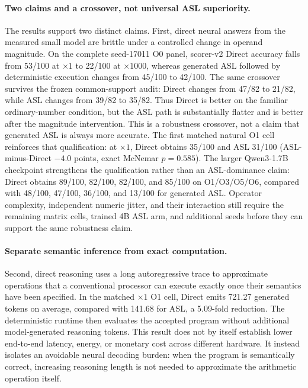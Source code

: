 \documentclass[11pt]{article}
\begin{document}
\paragraph{Two claims and a crossover, not universal ASL superiority.}
The results support two distinct claims.  First, direct neural answers from the
measured small model are brittle under a controlled change in operand magnitude.
On the complete seed-17011 O0 panel, scorer-v2 Direct accuracy falls from
53/100 at $\times1$ to 22/100 at $\times1000$, whereas generated ASL followed
by deterministic execution changes from 45/100 to 42/100.  The same crossover
survives the frozen common-support audit: Direct changes from 47/82 to 21/82,
while ASL changes from 39/82 to 35/82.  Thus Direct is better on the familiar
ordinary-number condition, but the ASL path is substantially flatter and is
better after the magnitude intervention.  This is a robustness crossover, not
a claim that generated ASL is always more accurate.  The first matched natural
O1 cell reinforces that qualification: at $\times1$, Direct obtains 35/100 and
ASL 31/100 (ASL-minus-Direct $-4.0$ points, exact McNemar $p=0.585$).
The larger Qwen3-1.7B checkpoint strengthens the qualification rather than an
ASL-dominance claim: Direct obtains 89/100, 82/100, 82/100, and 85/100 on
O1/O3/O5/O6, compared with 48/100, 47/100, 36/100, and 13/100 for generated
ASL. Operator complexity,
independent numeric jitter, and their interaction still require the remaining
matrix cells, trained 4B ASL arm, and additional seeds before they can support
the same robustness claim.

\paragraph{Separate semantic inference from exact computation.}
Second, direct reasoning uses a long autoregressive trace to approximate
operations that a conventional processor can execute exactly once their
semantics have been specified.  In the matched $\times1$ O1 cell, Direct emits
721.27 generated tokens on average, compared with 141.68 for ASL, a 5.09-fold
reduction.  The deterministic runtime then evaluates the accepted program
without additional model-generated reasoning tokens.  This result does not by
itself establish lower end-to-end latency, energy, or monetary cost across
different hardware.  It instead isolates an avoidable neural decoding burden:
when the program is semantically correct, increasing reasoning length is not
needed to approximate the arithmetic operation itself.
\end{document}
